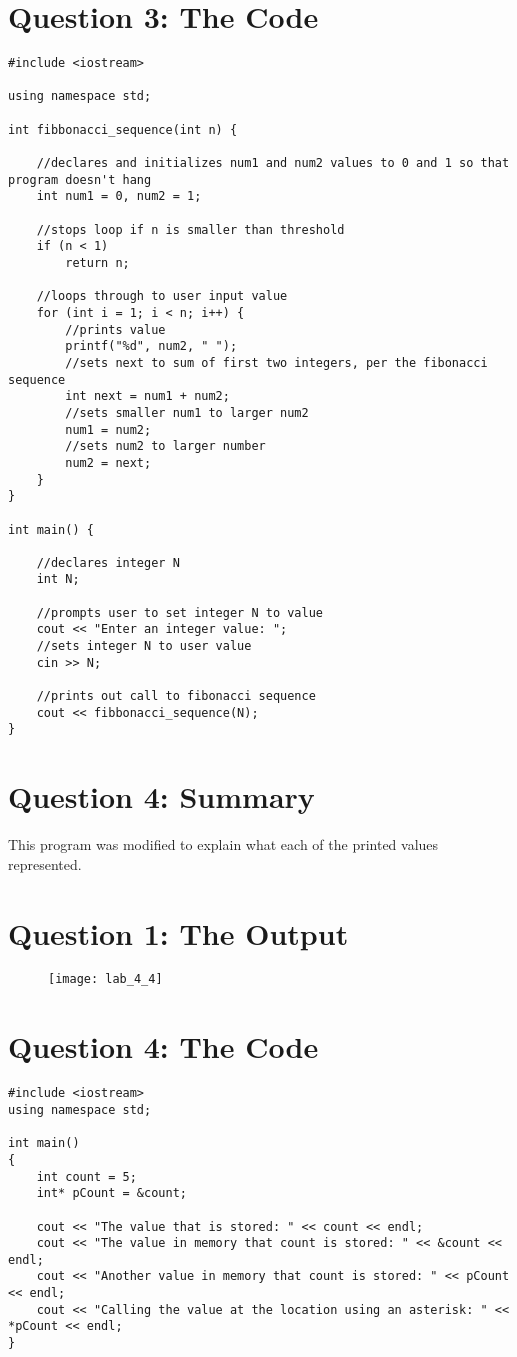 \documentclass[11pt]{article}
\begin{document}
\section*{Question 3: The Code}
\begin{lstlisting}
#include <iostream>

using namespace std;

int fibbonacci_sequence(int n) {

    //declares and initializes num1 and num2 values to 0 and 1 so that program doesn't hang
    int num1 = 0, num2 = 1;

    //stops loop if n is smaller than threshold
    if (n < 1)
        return n;

    //loops through to user input value
    for (int i = 1; i < n; i++) {
        //prints value
        printf("%d", num2, " ");
        //sets next to sum of first two integers, per the fibonacci sequence
        int next = num1 + num2;
        //sets smaller num1 to larger num2
        num1 = num2;
        //sets num2 to larger number
        num2 = next;
    }
}

int main() {

    //declares integer N
    int N;

    //prompts user to set integer N to value
    cout << "Enter an integer value: ";
    //sets integer N to user value
    cin >> N;

    //prints out call to fibonacci sequence
    cout << fibbonacci_sequence(N);
}
\end{lstlisting}

\section*{Question 4: Summary}
This program was modified to explain what each of the printed values represented.

\section*{Question 1: The Output}
\begin{figure}[H]
    \centering
    \texttt{[image: lab\_4\_4]}
\end{figure}

\section*{Question 4: The Code}
\begin{lstlisting}
#include <iostream>
using namespace std;

int main()
{
    int count = 5;
    int* pCount = &count;

    cout << "The value that is stored: " << count << endl;
    cout << "The value in memory that count is stored: " << &count << endl;
    cout << "Another value in memory that count is stored: " << pCount << endl;
    cout << "Calling the value at the location using an asterisk: " << *pCount << endl;
}
\end{lstlisting}
\end{document}
